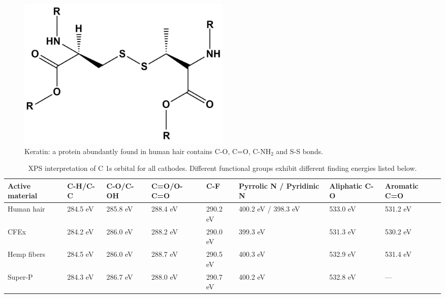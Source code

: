 \begin{figure}[h!]
\centering
\includegraphics[width=0.5\textwidth]{Figures/chap5fig/keratin}
\caption{Keratin: a protein abundantly found in human hair contains C-O, C=O, C-NH$_2$ and S-S bonds.}
\label{Figures/chap5fig:keratin}
\end{figure}

\begin{table}
\centering
\caption{XPS interpretation of C 1s orbital for all cathodes. Different functional groups exhibit different finding energies listed below.} \label{table2xps}
\begin{tabular}{ |p{2.5cm}|p{2cm}|p{2cm}|p{2cm}|p{1.5cm}|p{2.5cm}|p{2.5cm}|p{2.5cm}|}
\hline
\textbf{Active material} & \textbf{C-H/C-C} & \textbf{C-O/C-OH} & \textbf{C=O/O-C=O} & \textbf{C-F} & \textbf{Pyrrolic N / Pyridinic N} & \textbf{Aliphatic C-O} & \textbf{Aromatic C=O}\\
\hline
Human hair & 284.5 eV & 285.8 eV & 288.4 eV & 290.2 eV & 400.2 eV / 398.3 eV & 533.0 eV & 531.2 eV\\
CFEx & 284.2 eV & 286.0 eV & 288.2 eV & 290.0 eV & 399.3 eV & 531.3 eV & 530.2 eV\\
Hemp fibers & 284.5 eV & 286.0 eV & 288.7 eV & 290.5 eV & 400.3 eV & 532.9 eV & 531.4 eV\\
Super-P & 284.3 eV & 286.7 eV & 288.0 eV & 290.7 eV & 400.2 eV & 532.8 eV & ---\\
\hline
\end{tabular}
\end{table}

